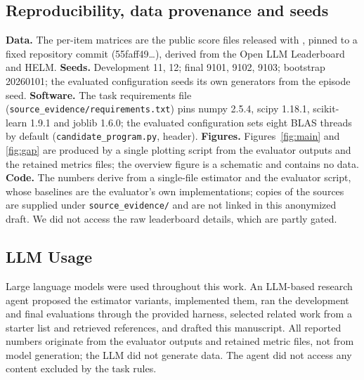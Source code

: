 \documentclass{article}
\begin{document}
\subsection{Reproducibility, data provenance and seeds}
\textbf{Data.} The per-item matrices are the public score files released with \citet{Zhang2025HowBP}, pinned to a fixed repository commit (55faff49\ldots{}), derived from the Open LLM Leaderboard and HELM. \textbf{Seeds.} Development 11, 12; final 9101, 9102, 9103; bootstrap 20260101; the evaluated configuration seeds its own generators from the episode seed. \textbf{Software.} The task requirements file (\texttt{source\_evidence/requirements.txt}) pins numpy 2.5.4, scipy 1.18.1, scikit-learn 1.9.1 and joblib 1.6.0; the evaluated configuration sets eight BLAS threads by default (\texttt{candidate\_program.py}, header). \textbf{Figures.} Figures~\ref{fig:main} and \ref{fig:gap} are produced by a single plotting script from the evaluator outputs and the retained metrics files; the overview figure is a schematic and contains no data. \textbf{Code.} The numbers derive from a single-file estimator and the evaluator script, whose baselines are the evaluator's own implementations; copies of the sources are supplied under \texttt{source\_evidence/} and are not linked in this anonymized draft. We did not access the raw leaderboard details, which are partly gated.

\subsection{LLM Usage}
Large language models were used throughout this work. An LLM-based research agent proposed the estimator variants, implemented them, ran the development and final evaluations through the provided harness, selected related work from a starter list and retrieved references, and drafted this manuscript. All reported numbers originate from the evaluator outputs and retained metric files, not from model generation; the LLM did not generate data. The agent did not access any content excluded by the task rules.
\end{document}
